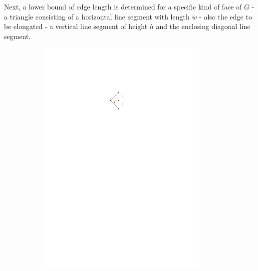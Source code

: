\bigskip
Next, a lower bound of edge length is determined for a specific kind of face of $G$ - a triangle consisting of a horizontal line segment with length $w$ - also the edge to be elongated - a vertical line segment of height $h$ and the enclosing diagonal line segment. 
\begin{figure}[H]
	\centering
	\begin{subfigure}{0.4\linewidth}
		\centering
		\includegraphics[width=0.9\textwidth,page=4]{drawings/maximal_planar.pdf}
		\caption{}
	\end{subfigure}
	\begin{subfigure}{0.4\linewidth}
		\centering

\end{subfigure}
\end{figure}
